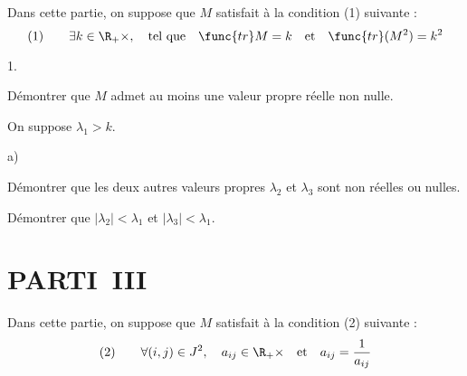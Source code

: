 \documentclass[11pt]{article}%
\begin{document}
Dans cette partie, on suppose que $M$ satisfait à la condition (1)
suivante :
\[
(1)\qquad \exists k\in \R_{+}{\times },\quad \text{tel que}\quad 
\func{tr}M = k\quad \text{et}\quad \func{tr}(M^{2}) = k^{2}
\]

\begin{noliste}{1.}
 \setlength{\itemsep}{4mm}
\item Démontrer que $M$ admet au moins une valeur propre réelle non
nulle.

\item On suppose $\lambda_{1}>k.$

\begin{noliste}{a)}
 \setlength{\itemsep}{2mm}
\item Démontrer que les deux autres valeurs propres $\lambda_{2}$ et
$\lambda_{3}$ sont non réelles ou nulles.

\item Démontrer que $\left| \lambda_{2}\right| <\lambda_{1}$ et $\left|
\lambda_{3}\right| <\lambda_{1}.$
\end{noliste}
\end{noliste}

\section*{PARTI\E\ III}

Dans cette partie, on suppose que $M$ satisfait à la condition (2)
suivante :
\[
(2)\qquad \forall (i,j)\in J^{2},\quad a_{ij}\in \R_{+}{\times
}\quad \text{et}\quad a_{ij} = \dfrac{1}{a_{ij}}
\]
\end{document}
